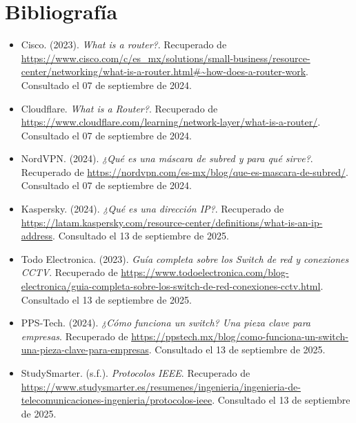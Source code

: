 \documentclass[letterpaper,12pt,oneside]{article}
\begin{document}
\section*{Bibliografía}
\begin{itemize}
    \item Cisco. (2023). \textit{What is a router?}. Recuperado de \url{https://www.cisco.com/c/es_mx/solutions/small-business/resource-center/networking/what-is-a-router.html#~how-does-a-router-work}. Consultado el 07 de septiembre de 2024.
    \item Cloudflare. \textit{What is a Router?}. Recuperado de \url{https://www.cloudflare.com/learning/network-layer/what-is-a-router/}. Consultado el 07 de septiembre de 2024.
    \item NordVPN. (2024). \textit{¿Qué es una máscara de subred y para qué sirve?}. Recuperado de \url{https://nordvpn.com/es-mx/blog/que-es-mascara-de-subred/}. Consultado el 07 de septiembre de 2024.
    \item Kaspersky. (2024). \textit{¿Qué es una dirección IP?}. Recuperado de \url{https://latam.kaspersky.com/resource-center/definitions/what-is-an-ip-address}. Consultado el 13 de septiembre de 2025.
    \item Todo Electronica. (2023). \textit{Guía completa sobre los Switch de red y conexiones CCTV}. Recuperado de \url{https://www.todoelectronica.com/blog-electronica/guia-completa-sobre-los-switch-de-red-conexiones-cctv.html}. Consultado el 13 de septiembre de 2025.
    \item PPS-Tech. (2024). \textit{¿Cómo funciona un switch? Una pieza clave para empresas}. Recuperado de \url{https://ppstech.mx/blog/como-funciona-un-switch-una-pieza-clave-para-empresas}. Consultado el 13 de septiembre de 2025.
    \item StudySmarter. (s.f.). \textit{Protocolos IEEE}. Recuperado de \url{https://www.studysmarter.es/resumenes/ingenieria/ingenieria-de-telecomunicaciones-ingenieria/protocolos-ieee}. Consultado el 13 de septiembre de 2025.
\end{itemize}
\end{document}
